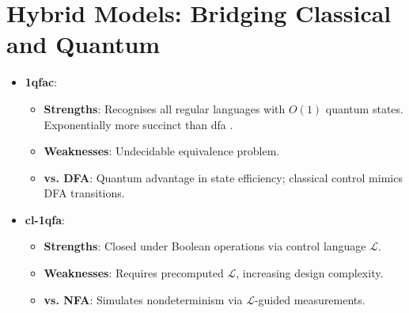 \begin{table}[ht]
\centering
{}
\caption{Comparison of one-way QFAs vs. classical DFA. QFAs offer state efficiency but weaker closure.}
\label{tab:one-way-vs-dfa}
\end{table}

\section{Hybrid Models: Bridging Classical and Quantum}
\label{sec:hybrid-comparison}

\begin{itemize}
    \item \textbf{\gls{1qfac}}:
    \begin{itemize}
        \item \textbf{Strengths}: Recognises all regular languages with \( O(1) \) quantum states. Exponentially more succinct than \gls{dfa} \cite{zheng2012one}.
        \item \textbf{Weaknesses}: Undecidable equivalence problem.
        \item \textbf{vs. DFA}: Quantum advantage in state efficiency; classical control mimics DFA transitions.
    \end{itemize}
    
    \item \textbf{\gls{cl-1qfa}}:
    \begin{itemize}
        \item \textbf{Strengths}: Closed under Boolean operations via control language \( \mathcal{L} \).
        \item \textbf{Weaknesses}: Requires precomputed \( \mathcal{L} \), increasing design complexity.
        \item \textbf{vs. NFA}: Simulates nondeterminism via \( \mathcal{L} \)-guided measurements.
    \end{itemize}
\end{itemize}

